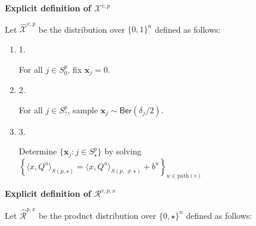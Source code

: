 \par\medskip\noindent\textbf{Explicit definition of $\mathcal{X}^{v,p}$
}\par




Let $\widehat{\mathcal{X}}^{v,p}$ be the distribution over $\{0,1\}^{n}$ defined as follows:\par


\begin{enumerate}


\item[] 
1. 


For all $j\in S^{p}_{0}$, fix $\bm{x}_{j}=0$.\par





\item[] 
2. 


For all $j\in S^{p}_{\mathord{?}}$, sample $\bm{x}_{j}\sim\mathsf{Ber}(\delta_{j}/2)$.\par





\item[] 
3. 


Determine $\{\bm{x}_{j}\colon j\in S^{p}_{\star}\}$ by solving $\left\{\langle x,Q^{u}\rangle_{S(p,\star)}=\langle x,Q^{u}\rangle_{S(p,\neq\star)}+b^{u}\right\}_{u\in\mathrm{path}(v)}$\par





\end{enumerate}





\par\medskip\noindent\textbf{Explicit definition of $\mathcal{R}^{v,p,x}$
}\par




Let $\widehat{\mathcal{R}}^{p,x}$ be the product distribution over $\{0,\star\}^{n}$ defined as follows:\par


